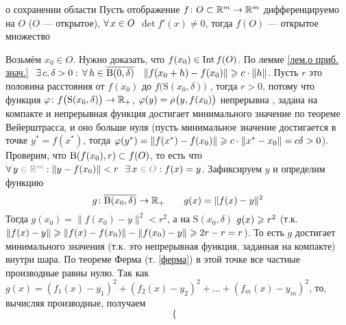 
\begin{teor}[https://www.youtube.com/live/Ebv-BznzM6k?si=3Atsj-07Hm2T04HF&t=1318]{о сохранении области}\label{сохр.обл.}%
	Пусть отображение $f \colon O \subset \mathbb R^m \to \mathbb R^m$ дифференцируемо на $O$ ($O$ --- открытое), $\forall \, x \in O$ $\det f'(x) \ne 0$, тогда $f(O)$  --- открытое множество
\end{teor}

\begin{prf}
	Возьмём $x_0 \in O$. Нужно доказать, что $f(x_0) \in \mathrm{Int}\, f(O)$. По лемме \ref{лем.о приб. знач.}$\E c, \delta > 0 :{}$\linebreak $\A h \in \overline{\B{0, \delta}}\ \ \  \|f(x_0 + h) - f(x_0)\| \biger c \cdot \|h\|$.
	Пусть $r$ это половина расстояния от $f(x_0)$ до $f\bigl(\mathrm S (x_0, \delta)\bigr)$ , тогда $r > 0$, потому что функция $\varphi \colon f\bigl(\mathrm S (x_0, \delta)\bigr) \to \mathbb R_{+}$, $\varphi(y) = \rho_{}\bigl(y, f(x_0)\bigr)$ непрерывна , задана на компакте  и непрерывная функция достигает минимального значение по теореме Вейерштрасса, и оно больше нуля (пусть минимальное значение достигается в точке $y^* = f(x^*)$, тогда $\varphi(y^*) = \|f(x^*) - f(x_0)\| \geqslant c \cdot \|x^* - x_0\| = c \delta > 0$). \\ 
	Проверим, что $\mathrm B(f(x_0), r) \subset f(O)$, то есть что $\A y \uns{{}\in \rmm} : \|y - f(x_0)\| < r \E x \uns{{}\in O} : f(x) = y$. Зафиксируем $y$ и определим функцию \[g\colon \overline{\mathrm B(x_0, \delta)} \to \mathbb R_+ \qquad g(x) = \|f(x) - y\|^2\] Тогда $g(x_0) = \|f(x_0) - y\|^2 < r^2$, а
	на $\mathrm S(x_0, \delta)$ $g(x) \geqslant r^2$ (т.к. $\|f(x) - y\| \geqslant \|f(x) - f(x_0)\| - \|f(x_0) - y\| \geqslant 2r - r = r$). То есть $g$ достигает минимального значения (т.к. это непрерывная функция, заданная на компакте) внутри шара. По теореме Ферма (т. \ref{ферма}) в этой точке все частные производные равны нулю.
	Так как $g(x) = (f_1(x) - y_1)^2 + (f_2(x) - y_2)^2 + \ldots + (f_m(x) - y_m)^2$, то, вычисляя производные, получаем
	\[\begin{cases}

\end{cases}\]
\end{prf}
